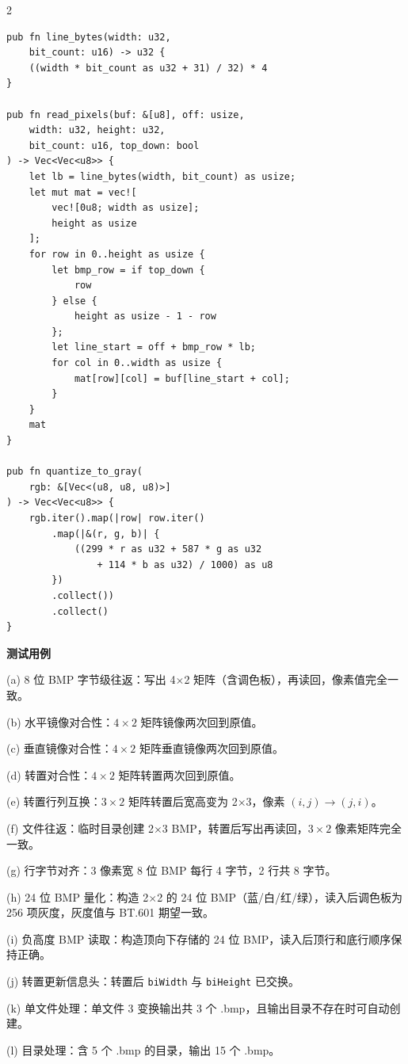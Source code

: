 {\begin{multicols}{2}
\begin{verbatim}
pub fn line_bytes(width: u32,
    bit_count: u16) -> u32 {
    ((width * bit_count as u32 + 31) / 32) * 4
}

pub fn read_pixels(buf: &[u8], off: usize,
    width: u32, height: u32,
    bit_count: u16, top_down: bool
) -> Vec<Vec<u8>> {
    let lb = line_bytes(width, bit_count) as usize;
    let mut mat = vec![
        vec![0u8; width as usize];
        height as usize
    ];
    for row in 0..height as usize {
        let bmp_row = if top_down {
            row
        } else {
            height as usize - 1 - row
        };
        let line_start = off + bmp_row * lb;
        for col in 0..width as usize {
            mat[row][col] = buf[line_start + col];
        }
    }
    mat
}

pub fn quantize_to_gray(
    rgb: &[Vec<(u8, u8, u8)>]
) -> Vec<Vec<u8>> {
    rgb.iter().map(|row| row.iter()
        .map(|&(r, g, b)| {
            ((299 * r as u32 + 587 * g as u32
                + 114 * b as u32) / 1000) as u8
        })
        .collect())
        .collect()
}
\end{verbatim}
\end{multicols}
}

{\fontsize{6pt}{8pt}\selectfont
\setlength{\parindent}{0pt}
\noindent\textbf{测试用例}\par
\noindent (a) 8 位 BMP 字节级往返：写出 4$\times$2 矩阵（含调色板），再读回，像素值完全一致。\par
\noindent (b) 水平镜像对合性：$4\times2$ 矩阵镜像两次回到原值。\par
\noindent (c) 垂直镜像对合性：$4\times2$ 矩阵垂直镜像两次回到原值。\par
\noindent (d) 转置对合性：$4\times2$ 矩阵转置两次回到原值。\par
\noindent (e) 转置行列互换：$3\times2$ 矩阵转置后宽高变为 2$\times$3，像素 $(i,j) \to (j,i)$。\par
\noindent (f) 文件往返：临时目录创建 2$\times$3 BMP，转置后写出再读回，$3\times2$ 像素矩阵完全一致。\par
\noindent (g) 行字节对齐：3 像素宽 8 位 BMP 每行 4 字节，2 行共 8 字节。\par
\noindent (h) 24 位 BMP 量化：构造 2$\times$2 的 24 位 BMP（蓝/白/红/绿），读入后调色板为 256 项灰度，灰度值与 BT.601 期望一致。\par
\noindent (i) 负高度 BMP 读取：构造顶向下存储的 24 位 BMP，读入后顶行和底行顺序保持正确。\par
\noindent (j) 转置更新信息头：转置后 \texttt{biWidth} 与 \texttt{biHeight} 已交换。\par
\noindent (k) 单文件处理：单文件 3 变换输出共 3 个 .bmp，且输出目录不存在时可自动创建。\par
\noindent (l) 目录处理：含 5 个 .bmp 的目录，输出 15 个 .bmp。\par
}
